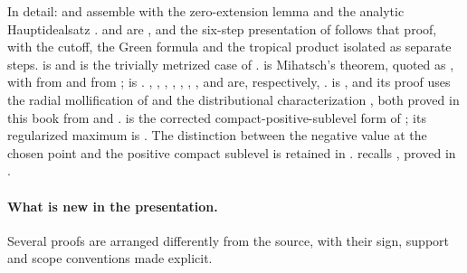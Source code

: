 In detail:  and
 assemble
\cite[\S\S13.6--13.7 and \S\S16.7.1--16.7.2]{CLD25} with the zero-extension
lemma \cite[Lemma~7.1.13]{CLD25} and the analytic Hauptidealsatz
\cite[Lemma~11.5.2]{CLD25}.
 and  are
\cite[Theorem~16.7.3 and Lemmas~16.7.4--16.7.5]{CLD25}, and the six-step
presentation of  follows that proof, with the
cutoff, the Green formula \cite[Proposition~5.11.1]{CLD25} and the tropical
product  isolated as separate steps.
 is \cite[Theorem~18.1.6]{CLD25} and
 is the trivially metrized case of
\cite[Corollary~18.1.7]{CLD25}.
 is Mihatsch's theorem, quoted as
\cite[Theorem~18.7.2]{CLD25}, with  from
\cite[Corollary~18.6.2]{CLD25} and
 from
\cite[Proposition~18.7.3]{CLD25};  is
\cite[Theorem~18.7.5]{CLD25}.
, ,
, ,
, ,
,  and
 are, respectively,
\cite[Lemma~8.1.2, Lemma~8.1.4, Proposition~8.1.9, Lemma~8.1.10,
Proposition~8.1.12, Definition~8.1.13, Proposition~8.2.1, Corollary~8.2.3 and
Proposition~8.1.5]{CLD25}.   is
\cite[Proposition~8.3.2]{CLD25}, and its proof uses the radial mollification
of  and the distributional
characterization , both proved in
this book from \cite[\S10]{Roc70} and \cite{EvansGariepy}.
 is the corrected compact-positive-sublevel form
of \cite[Proposition~16.9.1]{CLD25}; its regularized maximum is
\cite[Lemma~5.18]{DemBook}.  The distinction between the negative value at
the chosen point and the positive compact sublevel is retained in
.
 recalls
\cite[Theorem~16.9.2 and Corollaries~16.9.3--16.9.4]{CLD25}, proved in
.

\paragraph{What is new in the presentation.}
Several proofs are arranged differently from the source, with their sign,
support and scope conventions made explicit.

